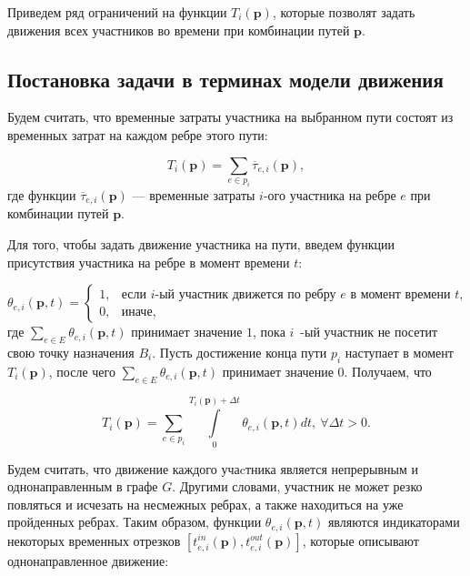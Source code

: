 \documentclass[12pt, a4paper]{article}
\begin{document}
Приведем ряд ограничений на функции $T_i (\textbf{p})$, которые позволят задать движения всех участников во времени при комбинации путей $\textbf{p}$.

\subsection{Постановка задачи в терминах модели движения}

Будем считать, что временные затраты участника на выбранном пути состоят из временных затрат на каждом ребре этого пути:


$$T_i (\textbf{p}) = \sum \limits_{e \in p_i} \overline{\tau}_{e, i} (\textbf{p}), $$
где функции $\overline{\tau}_{e, i} (\textbf{p})$ --- временные затраты $i$-ого участника на ребре $e$ при комбинации путей $\textbf{p}$. 


Для того, чтобы задать движение участника на пути, введем функции присутствия участника на ребре в момент времени $t$:

$$
\theta_{e, i} (\textbf{p}, t) =
\begin{cases}
	1, & \text{если }  i\text{-ый участник движется по ребру $e$ в момент времени $t$,}  \\
	0, & \text{иначе},
\end{cases}
$$
где $\sum\limits_{e \in E} \theta_{e, i} (\textbf{p}, t)$ принимает значение $1$, пока $i$~-ый участник не посетит свою точку назначения $B_i$. Пусть достижение конца пути $p_i$ наступает в момент $T_i(\textbf{p})$, после чего $\sum\limits_{e \in E} \theta_{e, i} (\textbf{p}, t)$ принимает значение $0$. Получаем, что
	
\begin{equation}
	\label{eq:T_i_by_theta}
	T_i(\textbf{p}) = \sum \limits_{e \in p_i} \int\limits_{0}^{T_i(\textbf{p}) + \Delta t} \theta_{e, i} (\textbf{p}, t) dt, \: \forall \Delta t > 0.
\end{equation}

Будем считать, что движение каждого учаcтника является непрерывным и однонаправленным в графе $G$. Другими словами, участник не может резко повляться и исчезать на несмежных ребрах, а также находиться на уже пройденных ребрах. Таким образом, функции $\theta_{e, i} (\textbf{p}, t)$ являются индикаторами некоторых временных отрезков $[t_{e, i}^{in} (\textbf{p}), t_{e, i}^{out} (\textbf{p})]$, которые описывают однонаправленное движение:
\end{document}
